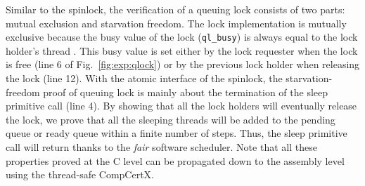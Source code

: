 Similar to the spinlock,
the verification of a queuing lock consists of
two parts: mutual exclusion and starvation freedom.
The lock implementation is mutually exclusive
because the busy value of the lock (\texttt{ql\_busy})
is always equal to the lock holder's thread \allid{}.
This busy value is set either
by the lock requester when the lock is free (line 6 of 
Fig.~\ref{fig:exp:qlock})
or by the previous lock holder when releasing the lock
(line 12).
With the atomic interface of the spinlock, the starvation-freedom proof of queuing lock
is mainly about the termination of the sleep primitive call
(line 4). By showing that all the lock holders
will eventually release the lock,
we prove that all the sleeping threads will be 
added to the pending queue or ready queue within a finite number
of steps. Thus, the sleep primitive call will return
thanks to the \emph{fair} software scheduler.
Note that all these properties proved at the C level can be propagated down to the assembly level using the thread-safe CompCertX.

